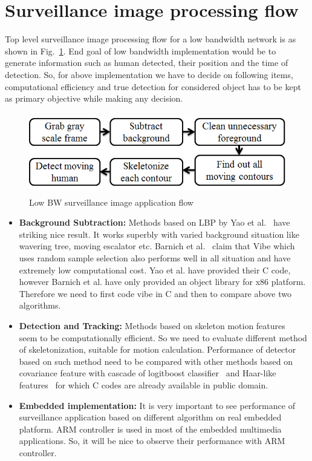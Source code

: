 \section{Surveillance image processing flow}
\indent Top level surveillance image processing flow for a low bandwidth
network is as shown in Fig.~\ref{image_pipeline}. End goal of low
bandwidth implementation would be to generate information such as human
detected, their position and the time of detection. So, for above
implementation we have to decide on following items, computational
efficiency and true detection for considered object has to be kept as
primary objective while making any decision.

\begin{figure}[!b]
\centering
\includegraphics[height=100pt]{Figures/image_pipeline}
\caption{Low BW surveillance image application flow}
\label{image_pipeline}
\end{figure}
\begin{itemize}
\item \textbf{Background Subtraction:} Methods based on LBP by Yao et
	al.~\cite{11} have striking nice result. It works superbly with
	varied background situation like wavering tree, moving escalator
	etc. Barnich et al.~\cite{9} claim that Vibe which uses random
	sample selection also performs well in all situation and have
	extremely low computational cost. Yao et al. have provided their
	C code, however Barnich et al.  have only provided an object
	library for x86 platform. Therefore we need to first code vibe
	in C and then to compare above two algorithms.
\item \textbf{Detection and Tracking:} Methods based on skeleton motion
	features~\cite{32, 22, 31} seem to be computationally
	efficient. So we need to evaluate different method of
	skeletonization, suitable for motion calculation. Performance of
	detector based on such method need to be compared with other
	methods based on covariance feature with cascade of logitboost
	classifier~\cite{19}  and Haar-like features~\cite{17} for
	which C codes are already available in public domain.
\item \textbf{Embedded implementation:} It is very important to see
	performance of surveillance application based on different
	algorithm on real embedded platform. ARM controller is used in
	most of the embedded multimedia applications. So, it will be
	nice to observe their performance with ARM controller.
\end{itemize}

